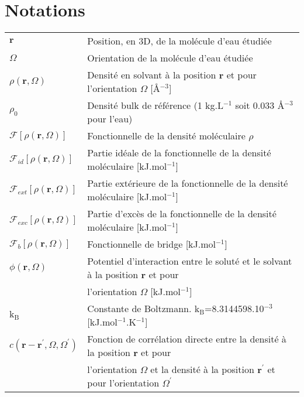 \documentclass{bredele}
\begin{document}
 
\renewcommand{\cftdotsep}{\cftnodots}
\cleardoublepage
\listoffigures
\cleardoublepage
\listoftables


\clearemptydoublepage
\section*{Notations}

\begin{tabular}{l l}
$\boldsymbol{r}$ & Position, en 3D, de la molécule d'eau étudiée \\
$\Omega$ & Orientation de la molécule d'eau étudiée \\
$\rho\left(\boldsymbol{r},\Omega \right)$ & Densité en solvant à la position $\boldsymbol{r}$ et pour l'orientation $\Omega$ [\AA$^{-3}$]  \\  
$\rho_0$ & Densité bulk de référence (1 kg.L$^{-1}$ soit 0.033 \AA$^{-3}$ pour l'eau) \\
$\mathcal{F}[\rho\left(\boldsymbol{r},\Omega \right)]$ & Fonctionnelle de la densité moléculaire $\rho$ \\
$\mathcal{F}_{id}[\rho\left(\boldsymbol{r},\Omega \right)]$ & Partie idéale de la fonctionnelle de la densité moléculaire [kJ.mol$^{-1}$]\\
$\mathcal{F}_{ext}[\rho\left(\boldsymbol{r},\Omega \right)]$ & Partie extérieure de la fonctionnelle de la densité moléculaire  [kJ.mol$^{-1}$]\\
$\mathcal{F}_{exc}[\rho\left(\boldsymbol{r},\Omega \right)]$ & Partie d'excès de la fonctionnelle de la densité moléculaire [kJ.mol$^{-1}$]\\
$\mathcal{F}_{b}[\rho\left(\boldsymbol{r},\Omega \right)]$ & Fonctionnelle de bridge [kJ.mol$^{-1}$]\\
$\phi\left(\boldsymbol{r},\Omega \right)$ & Potentiel d'interaction entre le soluté et le solvant à la position $\boldsymbol{r}$ et pour \\
 & l'orientation $\Omega$ [kJ.mol$^{-1}$]\\
$\mathrm{k_B}$ & Constante de Boltzmann. $\mathrm{k_B}$=8.3144598.10$^{-3}$ [kJ.mol$^{-1}$.K$^{-1}$]\\
$c\left(\boldsymbol{r}-\boldsymbol{r}^\prime,\Omega,\Omega^\prime \right)$ & Fonction de corrélation directe entre la densité à la position $\boldsymbol{r}$ et pour \\
 & l'orientation $\Omega$ et la densité à la position $\boldsymbol{r}^\prime$ et pour l'orientation $\Omega^\prime$\\

\end{tabular}
\end{document}
